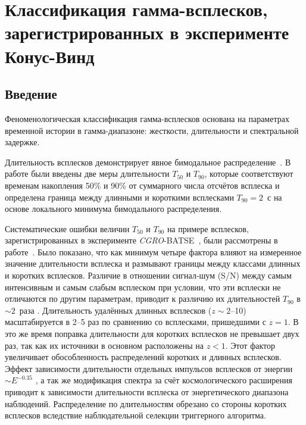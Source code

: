 \chapter{Классификация гамма-всплесков, зарегистрированных в эксперименте Конус-Винд}


\section{Введение}
Феноменологическая классификация  гамма-всплесков основана на параметрах 
временной истории в гамма-диапазоне: жесткости, длительности и спектральной задержке. 

Длительность всплесков демонстрирует явное бимодальное 
распределение~\citep{Mazets_1981_part_1,Norris_1984,Kouveliotou_1993,Aptekar_1998}. 
В работе \citep{Kouveliotou_1993} были введены две меры длительности $T_{50}$ и $T_{90}$, 
которые соответствуют временам накопления 50\% и 90\% от суммарного числа отсчётов 
всплеска и определена граница между длинными и короткими всплесками $T_{90}=2$~с 
на основе локального минимума бимодального распределения. 

Систематические ошибки величин $T_{50}$ и $T_{90}$ на примере всплесков, 
зарегистрированных в эксперименте \textit{CGRO}-BATSE~\citep{Fishman_1994}, 
были рассмотрены в работе~\citep{Norris_and_Bonnel_2006}. Было показано, 
что как минимум четыре фактора влияют на измеренное значение длительности 
всплеска и размывают границы между классами длинных и коротких всплесков. 
Различие в отношении сигнал-шум (S/N) между самым интенсивным и самым слабым 
всплеском  при условии, что эти всплески не отличаются по другим параметрам, 
приводит к различию их длительностей $T_{90}$ в $\sim2$~раза \citep{Bonnell_1997}. 
Длительность удалённых длинных всплесков ($z\sim2$--10)  масштабируется в 2--5 раз 
по сравнению со всплесками, пришедшими с $z=1$. В это же время поправка длительности 
для коротких всплесков не превышает двух раз, так как их источники в основном 
расположены на $z<1$. Этот фактор увеличивает обособленность распределений 
коротких и длинных всплесков. Эффект зависимости длительности отдельных импульсов 
всплесков от энергии $\sim E^{-0.35}$ \citep{Fenimore_1995}, а так же  модификация 
спектра за счёт космологического расширения приводит к зависимости длительности 
всплеска от энергетического диапазона наблюдений. Распределение по длительностям 
обрезано со стороны коротких всплесков вследствие наблюдательной селекции триггерного 
алгоритма. 

